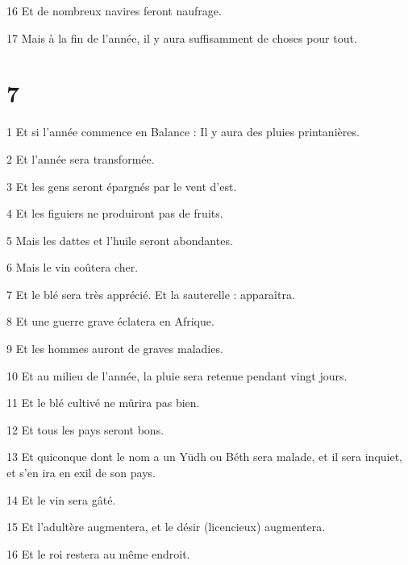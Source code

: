 \par 16 Et de nombreux navires feront naufrage.

\par 17 Mais à la fin de l'année, il y aura suffisamment de choses pour tout.

\chapter{7}

\par 1 Et si l'année commence en Balance : Il y aura des pluies printanières.

\par 2 Et l'année sera transformée.

\par 3 Et les gens seront épargnés par le vent d'est.

\par 4 Et les figuiers ne produiront pas de fruits.

\par 5 Mais les dattes et l'huile seront abondantes.

\par 6 Mais le vin coûtera cher.

\par 7 Et le blé sera très apprécié. Et la sauterelle : apparaîtra.

\par 8 Et une guerre grave éclatera en Afrique.

\par 9 Et les hommes auront de graves maladies.

\par 10 Et au milieu de l'année, la pluie sera retenue pendant vingt jours.

\par 11 Et le blé cultivé ne mûrira pas bien.

\par 12 Et tous les pays seront bons.

\par 13 Et quiconque dont le nom a un Yūdh ou Béth sera malade, et il sera inquiet, et s'en ira en exil de son pays.

\par 14 Et le vin sera gâté.

\par 15 Et l'adultère augmentera, et le désir (licencieux) augmentera.

\par 16 Et le roi restera au même endroit.

